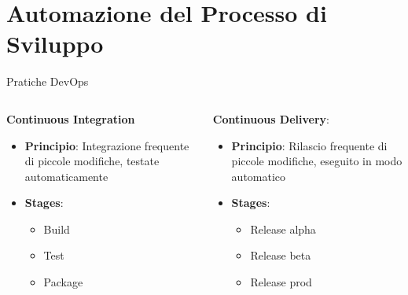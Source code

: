 
\section{Automazione del Processo di Sviluppo}

\begin{frame}{Pratiche DevOps}
    \begin{columns}[onlytextwidth,t]
        \begin{column}{0.45\textwidth}
    
            \textbf{Continuous Integration}
            \vspace{2mm}
            \begin{itemize}
                \item \textbf{Principio}: Integrazione frequente di piccole modifiche, testate automaticamente
                \vspace{2mm}
                \item \textbf{Stages}:
                \begin{itemize}
                    \item Build
                    \item Test
                    \item Package
                \end{itemize}
            \end{itemize}
            
        \end{column}
        \begin{column}{0.45\textwidth}

            \textbf{Continuous Delivery}:
            \vspace{2mm}
            \begin{itemize}
                \item \textbf{Principio}: Rilascio frequente di piccole modifiche, eseguito in modo automatico
                \vspace{2mm}
                \item \textbf{Stages}:
                \begin{itemize}
                    \item Release alpha
                    \item Release beta
                    \item Release prod
                \end{itemize}
            \end{itemize}
        

\end{column}
\end{columns}
\end{frame}
